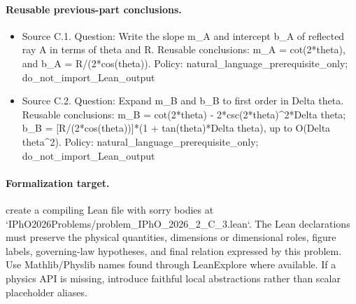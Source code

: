 \paragraph{Reusable previous-part conclusions.}
\begin{itemize}
\item Source C.1. Question: Write the slope m\_A and intercept b\_A of reflected ray A in terms of theta and R. Reusable conclusions: m\_A = cot(2*theta), and b\_A = R/(2*cos(theta)). Policy: natural\_language\_prerequisite\_only; do\_not\_import\_Lean\_output
\item Source C.2. Question: Expand m\_B and b\_B to first order in Delta theta. Reusable conclusions: m\_B = cot(2*theta) - 2*csc(2*theta)\textasciicircum{}2*Delta theta; b\_B = [R/(2*cos(theta))]*(1 + tan(theta)*Delta theta), up to O(Delta theta\textasciicircum{}2). Policy: natural\_language\_prerequisite\_only; do\_not\_import\_Lean\_output
\end{itemize}

\paragraph{Formalization target.}
create a compiling Lean file with sorry bodies at `IPhO2026Problems/problem\_IPhO\_2026\_2\_C\_3.lean`. The Lean declarations must preserve the physical quantities, dimensions or dimensional roles, figure labels, governing-law hypotheses, and final relation expressed by this problem.
Use Mathlib/Physlib names found through LeanExplore where available. If a physics API is missing, introduce faithful local abstractions rather than scalar placeholder aliases.

